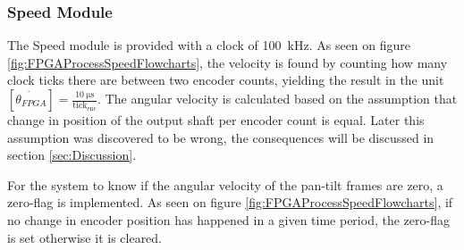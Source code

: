 \documentclass[../../main.tex]{subfiles}
\begin{document}
\subsubsection*{Speed Module}

The Speed module is provided with a clock of \SI{100}{\kilo \hertz}. As seen on figure \ref{fig:FPGAProcessSpeedFlowcharts}, the velocity is found by counting how many clock ticks there are between two encoder counts, yielding the result in the unit $\left[\dot{\theta_{FPGA}}\right] = \frac{\SI{10}{\micro \second}}{\mathrm{tick_{enc}}}$. The angular velocity is calculated based on the assumption that change in position of the output shaft per encoder count is equal. Later this assumption was discovered to be wrong, the consequences will be discussed in section \ref{sec:Discussion}.

For the system to know if the angular velocity of the pan-tilt frames are zero, a zero-flag is implemented. As seen on figure \ref{fig:FPGAProcessSpeedFlowcharts}, if no change in encoder position has happened in a given time period, the zero-flag is set otherwise it is cleared.


    
\end{document}
